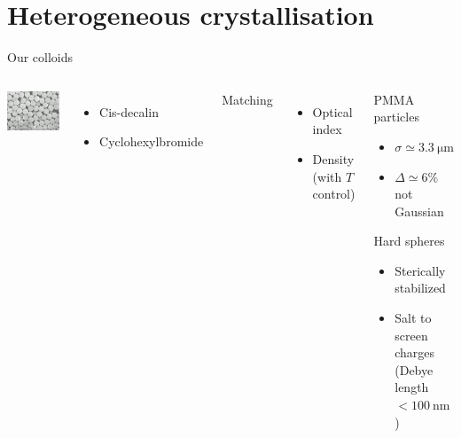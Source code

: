 \documentclass[xcolor=table]{beamer}
\begin{document}
\section{Heterogeneous crystallisation}

\begin{frame}{Our colloids}
	\begin{columns}
	\begin{center}
	\includegraphics[width=0.8\columnwidth, height=0.6\columnwidth]{SEM}
	\end{center}
	\begin{itemize}
		\item Cis-decalin
		\item Cyclohexylbromide
	\end{itemize}
	Matching
	\begin{itemize}
		\item Optical index
		\item Density (with $T$ control)
	\end{itemize}
	\begin{block}{PMMA particles}
		\begin{itemize}
			\item $\sigma \simeq \SI{3.3}{\micro\metre}$
			\item $\Delta \simeq 6\%$ not Gaussian
		\end{itemize}
		Hard spheres
		\begin{itemize}
			\item Sterically stabilized
			\item Salt to screen charges\\ (Debye length $<\SI{100}{\nano\metre}$)
		\end{itemize}
	\end{block}
	\end{columns}
\end{frame}
\end{document}
